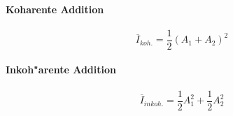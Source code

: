 \paragraph{Koharente Addition}
\begin{equation}
	\overline{I}_{koh.}=\frac{1}{2}\left(A_1+A_2\right)^2
\end{equation}

\paragraph{Inkoh"arente Addition}
\begin{equation}
	\overline{I}_{inkoh.}=\frac{1}{2}A_1^2+\frac{1}{2}A_2^2
\end{equation}

%
%
